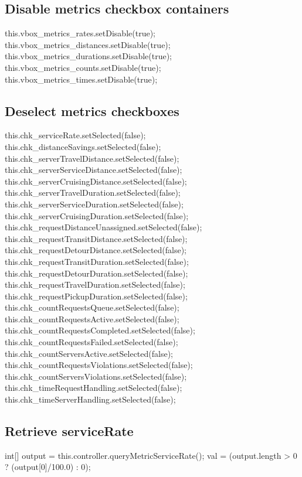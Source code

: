 \subsection{Disable metrics checkbox containers}
\nwenddocs{}\endmoddef{}
this.vbox_metrics_rates.setDisable(true);
this.vbox_metrics_distances.setDisable(true);
this.vbox_metrics_durations.setDisable(true);
this.vbox_metrics_counts.setDisable(true);
this.vbox_metrics_times.setDisable(true);
\nwendcode{}\nwdocspar

\subsection{Deselect metrics checkboxes}
\nwenddocs{}\endmoddef{}
this.chk_serviceRate.setSelected(false);
this.chk_distanceSavings.setSelected(false);
this.chk_serverTravelDistance.setSelected(false);
this.chk_serverServiceDistance.setSelected(false);
this.chk_serverCruisingDistance.setSelected(false);
this.chk_serverTravelDuration.setSelected(false);
this.chk_serverServiceDuration.setSelected(false);
this.chk_serverCruisingDuration.setSelected(false);
this.chk_requestDistanceUnassigned.setSelected(false);
this.chk_requestTransitDistance.setSelected(false);
this.chk_requestDetourDistance.setSelected(false);
this.chk_requestTransitDuration.setSelected(false);
this.chk_requestDetourDuration.setSelected(false);
this.chk_requestTravelDuration.setSelected(false);
this.chk_requestPickupDuration.setSelected(false);
this.chk_countRequestsQueue.setSelected(false);
this.chk_countRequestsActive.setSelected(false);
this.chk_countRequestsCompleted.setSelected(false);
this.chk_countRequestsFailed.setSelected(false);
this.chk_countServersActive.setSelected(false);
this.chk_countRequestsViolations.setSelected(false);
this.chk_countServersViolations.setSelected(false);
this.chk_timeRequestHandling.setSelected(false);
this.chk_timeServerHandling.setSelected(false);
\nwendcode{}\nwdocspar

\subsection{Retrieve serviceRate}
\nwenddocs{}\endmoddef{}
int[] output = this.controller.queryMetricServiceRate();
val = (output.length > 0 ? (output[0]/100.0) : 0);
\nwendcode{}\nwdocspar

